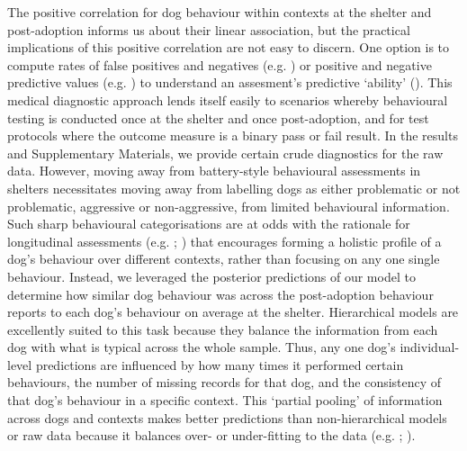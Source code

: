 \documentclass[12pt]{article}
\begin{document}
The positive correlation for dog behaviour within contexts at the shelter and post-adoption informs us about their linear association, but the practical implications of this positive correlation are not easy to discern. One option is to compute rates of false positives and negatives (e.g. \cite{marder2013}) or positive and negative predictive values (e.g. \cite{patbrad2016}) to understand an assesment's predictive `ability' (\cite{patronek2019}). This medical diagnostic approach lends itself easily to scenarios whereby behavioural testing is conducted once at the shelter and once post-adoption, and for test protocols where the outcome measure is a binary pass or fail result. In the results and Supplementary Materials, we provide certain crude diagnostics for the raw data. However, moving away from battery-style behavioural assessments in shelters necessitates moving away from labelling dogs as either problematic or not problematic, aggressive or non-aggressive, from limited behavioural information. Such sharp behavioural categorisations are at odds with the rationale for longitudinal assessments (e.g. \cite{ASPCA2018}; \cite{rayment2015}) that encourages forming a holistic profile of a dog's behaviour over different contexts, rather than focusing on any one single behaviour. Instead, we leveraged the posterior predictions of our model to determine how similar dog behaviour was across the post-adoption behaviour reports to each dog's behaviour on average at the shelter. Hierarchical models are excellently suited to this task because they balance the information from each dog with what is typical across the whole sample. Thus, any one dog's individual-level predictions are influenced by how many times it performed certain behaviours, the number of missing records for that dog, and the consistency of that dog's behaviour in a specific context. This `partial pooling' of information across dogs and contexts makes better predictions than non-hierarchical models or raw data because it balances over- or under-fitting to the data (e.g. \cite{gelman2007}; \cite{mcelreath2014}).
\end{document}
